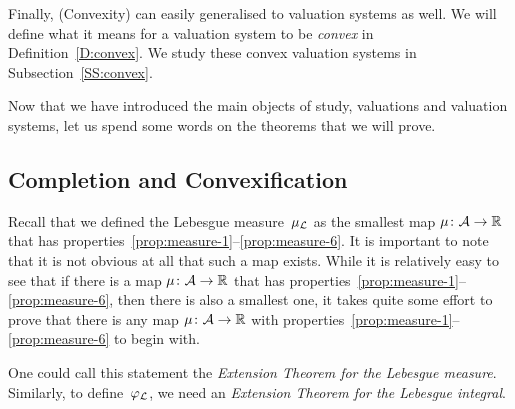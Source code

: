 \documentclass[main.tex]{subfiles}
\begin{document}
Finally,
(Convexity)
can easily generalised to valuation systems as well.
We will define what it means
for a valuation system to be \emph{convex}
in  Definition~\ref{D:convex}.
We study these convex valuation systems in Subsection~\ref{SS:convex}.

\vspace{1em}
\noindent
Now that we have introduced
the main objects of study,
valuations and valuation systems,
let us spend some words on the theorems that we will prove.


\subsection{Completion and Convexification}
Recall that we defined
the Lebesgue measure~$\mu_{\mathcal{L}}$
as the smallest map $\mu\colon \mathcal{A}\rightarrow \mathbb{R}$
that has properties~\ref{prop:measure-1}--\ref{prop:measure-6}.
It is important to note that
it is not obvious at all that such a map exists.
While it is relatively easy to see
that if there is a map $\mu\colon \mathcal{A} \rightarrow \mathbb{R}$
that has properties~\ref{prop:measure-1}--\ref{prop:measure-6},
then there is also a smallest one,
it takes quite some effort
to prove that there is any map $\mu\colon \mathcal{A}\rightarrow \mathbb{R}$
with properties~\ref{prop:measure-1}--\ref{prop:measure-6} to begin with.

One could call this statement the \emph{Extension Theorem
for the Lebesgue measure}.
Similarly,
to define~$\varphi_{\mathcal{L}}$,
we need an \emph{Extension Theorem
for the Lebesgue integral}.
\end{document}

